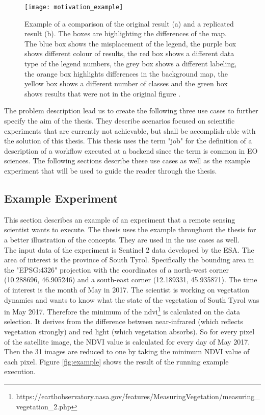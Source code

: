 \documentclass[draft,final]{vutinfth} %
\begin{document}
\begin{figure}[h]
	\centering
	\texttt{[image: motivation\_example]}
	\caption{Example of a comparison of the original result (a) and a replicated result (b). The boxes are highlighting the differences of the map. The blue box shows the misplacement of the legend, the purple box shows different colour of results, the red box shows a different data type of the legend numbers, the grey box shows a different labeling, the orange box highlights differences in the background map, the yellow box shows a different number of classes and the green box shows results that were not in the original figure \cite{Thestateofreproducibility}.}
	\label{fig:motivation} %
\end{figure} 

The problem description lead us to create the following three use cases to further specify the aim of the thesis. They describe scenarios focused on scientific experiments that are currently not achievable, but shall be accomplish-able with the solution of this thesis. This thesis uses the term "job" for the definition of a description of a workflow executed at a backend since the term is common in EO sciences. The following sections describe these use cases as well as the example experiment that will be used to guide the reader through the thesis.  

\subsection{Example Experiment}\label{example}

This section describes an example of an experiment that a remote sensing scientist wants to execute. The thesis uses the example throughout the thesis for a better illustration of the concepts. They are used in the use cases as well. \\
The input data of the experiment is Sentinel 2 data developed by the ESA. The area of interest is the province of South Tyrol. Specifically the bounding area in the "EPSG:4326" projection with the coordinates of a north-west corner (10.288696, 46.905246) and a south-east corner (12.189331, 45.935871). The time of interest is the month of May in 2017. The scientist is working on vegetation dynamics and wants to know what the state of the vegetation of South Tyrol was in May 2017. Therefore the minimum of the  \gls{ndvi}\footnote{https://earthobservatory.nasa.gov/features/MeasuringVegetation/measuring\_vegetation\_2.php} is calculated on the data selection. It derives from the difference between near-infrared (which reflects vegetation strongly) and red light (which vegetation absorbs). So for every pixel of the satellite image, the NDVI value is calculated for every day of May 2017. Then the 31 images are reduced to one by taking the minimum NDVI value of each pixel. Figure \ref{fig:example} shows the result of the running example execution.\\
\end{document}
